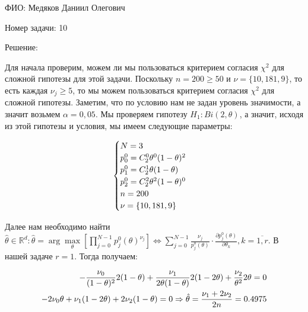 \documentclass[14pt]{extarticle}
\begin{document}
ФИО: Медяков Даниил Олегович

\vspace{10pt}

Номер задачи: 10

\vspace{10pt}

Решение:

\vspace{10pt}

Для начала проверим, можем ли мы пользоваться критерием согласия $\chi^2$ для сложной гипотезы для этой задачи. Поскольку $n = 200 \geq 50$ и $\nu = \{10, 181, 9\}$, то есть каждая $\nu_j \geq 5$, то мы можем пользоваться критерием согласия $\chi^2$ для сложной гипотезы. Заметим, что по условию нам не задан уровень значимости, а значит возьмем $\alpha = 0,05$. Мы проверяем гипотезу $H_1: Bi(2, \theta)$, а значит, исходя из этой гипотезы и условия, мы имеем следующие параметры:

\begin{eqnarray}
\notag
\begin{cases}
    N = 3\\
    p_0^0 = C_2^0 \theta^0 (1 - \theta)^2\\
    p_1^0 = C_2^1 \theta (1 - \theta)\\
    p_2^0 = C_2^2 \theta^2 (1 - \theta)^0\\
    n = 200\\
    \nu = \{10, 181, 9\}
\end{cases}
\end{eqnarray}

Далее нам необходимо найти $\hat{\theta}\in \mathbb R^d: \hat{\theta} = \arg\underset{\theta}{\max}\left[\prod\limits_{j = 0}^{N-1} p_j^0 (\theta)^{\nu_j}\right] \Leftrightarrow \sum\limits_{j = 0}^{N-1} \frac{\nu_j}{p_j^0(\theta)}\cdot\frac{\partial p_j^0 (\theta)}{\partial \theta_k}, k = \overline{1, r}$. В нашей задаче $r = 1$. Тогда получаем:

\begin{eqnarray}
\notag
    \begin{split}
        -\frac{\nu_0}{(1-\theta)^2}2(1-\theta) + \frac{\nu_1}{2\theta(1-\theta)}2(1 - 2\theta) + \frac{\nu_2}{\theta^2}2\theta = 0
        \\
        -2\nu_0\theta + \nu_1(1 - 2\theta) + 2\nu_2(1-\theta) = 0\Rightarrow \hat{\theta} = \frac{\nu_1 + 2\nu_2}{2n} = 0.4975
    \end{split}
\end{eqnarray}
\end{document}

